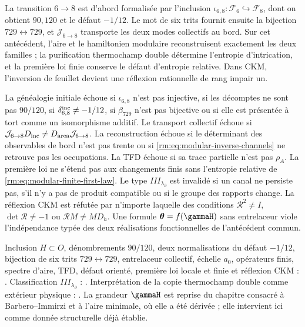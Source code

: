 \begin{keyresult}
La transition \(6\to8\) est d'abord formalisée par l'inclusion
\(\iota_{6,8}:\mathcal F_6\hookrightarrow\mathcal F_8\), dont on
obtient
\(90,120\) et le défaut \(-1/12\). Le mot de six trits fournit
ensuite la bijection \(729\leftrightarrow729\), et
\(\mathcal J_{6\to8}\) transporte les deux modes collectifs au bord. Sur
cet antécédent, l'aire et le hamiltonien modulaire reconstruisent exactement
les deux familles ; la purification thermochamp double détermine l'entropie
d'intrication, et la première loi
finie conserve le défaut d'entropie relative. Dans CKM, l'inversion de
feuillet devient une réflexion rationnelle de rang impair un.
\end{keyresult}

\begin{falsifier}
La généalogie initiale échoue si \(\iota_{6,8}\) n'est pas injective, si les
décomptes ne sont pas \(90/120\), si \(\delta_{6,8}^{\rm inc}\neq-1/12\), si
\(\beta_{729}\) n'est pas bijective ou si elle est présentée à tort comme un
isomorphisme additif. Le transport collectif échoue si
\(\mathcal J_{6\to8}D_{\rm inc}\neq
D_{\rm area}\mathcal J_{6\to8}\). La reconstruction échoue si le
déterminant des observables de bord n'est pas trente ou si
\cref{rm:eq:modular-inverse-channels} ne retrouve pas les occupations.
La TFD échoue si sa trace partielle n'est pas \(\rho_A\). La première loi ne
s'étend pas aux changements finis sans l'entropie relative de
\cref{rm:eq:modular-finite-first-law}. Le type
\(III_{\lambda_\partial}\) est invalidé si un canal ne persiste pas, s'il n'y a pas de
produit compatible ou si le groupe des rapports change. La réflexion CKM
est réfutée par n'importe laquelle des conditions
\(\mathcal R^2\neq I\), \(\det\mathcal R\neq-1\) ou
\(\mathcal RM\neq MD_h\). Une formule
\(\boldsymbol\theta=f(\gammaH)\) sans entrelaceur viole l'indépendance
typée des deux réalisations fonctionnelles de l'antécédent commun.
\end{falsifier}

\begin{statusbox}
Inclusion \(H\subset O\), dénombrements \(90/120\), deux normalisations du
défaut \(-1/12\), bijection de six trits \(729\leftrightarrow729\),
entrelaceur collectif, échelle \(a_0\), opérateurs finis, spectre d'aire,
TFD, défaut orienté, première loi locale et finie et réflexion CKM :
.
Classification
\(III_{\lambda_\partial}\) : . Interprétation de la copie thermochamp double comme extérieur physique :
. La grandeur \(\gammaH\) est reprise
du chapitre consacré à Barbero--Immirzi et à l'aire minimale, où elle a été dérivée ; elle intervient ici
comme donnée structurelle déjà établie.
\end{statusbox}
